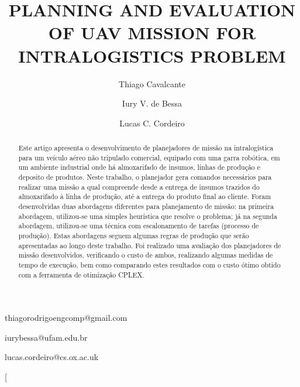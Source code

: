 \documentclass[conference,harvard,brazil,english]{sbatex}
\begin{document}

\title{PLANNING AND EVALUATION OF UAV MISSION FOR INTRALOGISTICS PROBLEM}

\author{Thiago Cavalcante}{thiagorodrigoengcomp@gmail.com}
\address{Graduate Program in Electrical Engineering, Federal University of Amazonas, Manaus, AM, Brazil}

\author{Iury V. de Bessa}{iurybessa@ufam.edu.br}
\address{Department of Electricity, Federal University of Amazonas, Manaus, AM, Brazil}

\author{Lucas C. Cordeiro}{lucas.cordeiro@cs.ox.ac.uk}
\address{Department of Computer Science, University of Oxford, Oxford, United Kingdom}



\twocolumn[

\maketitle

\begin{abstract}
 Este artigo apresenta o desenvolvimento de planejadores de missão na intralogística para um veículo aéreo não tripulado comercial, equipado com uma garra robótica, em um ambiente industrial onde há almoxarifado de insumos, linhas de produção e deposito de produtos. Neste trabalho, o planejador gera comandos necessários para realizar uma missão a qual compreende desde a entrega de insumos trazidos do almoxarifado à linha de produção, até a entrega do produto final ao cliente. Foram desenvolvidas duas abordagens diferentes para planejamento de missão: na primeira abordagem, utilizou-se uma simples heurística que resolve o problema; já na segunda abordagem, utilizou-se uma técnica com escalonamento de tarefas (processo de produção). Estas abordagens seguem algumas regras de produção que serão apresentadas ao longo deste trabalho. Foi realizado uma avaliação dos planejadores de missão desenvolvidos, verificando o custo de ambos, realizando algumas medidas de tempo de execução, bem como comparando estes resultados com o custo ótimo obtido  com a ferramenta de otimização CPLEX.   \end{abstract}

\end{document}
